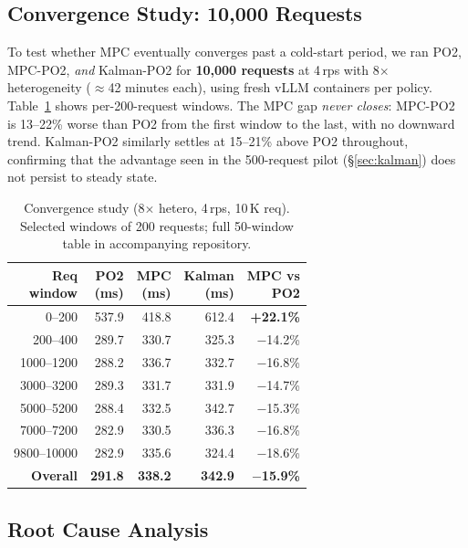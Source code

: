 \documentclass[blind]{gtac}
\begin{document}
\subsection{Convergence Study: 10,000 Requests}

To test whether MPC eventually converges past a cold-start period,
we ran PO2, MPC-PO2, \emph{and} Kalman-PO2 for \textbf{10,000 requests}
at 4\,rps with 8$\times$ heterogeneity ($\approx$42 minutes each),
using fresh vLLM containers per policy.
Table~\ref{tab:conv} shows per-200-request windows.
The MPC gap \emph{never closes}: MPC-PO2 is 13--22\% worse than PO2
from the first window to the last, with no downward trend.
Kalman-PO2 similarly settles at 15--21\% above PO2 throughout,
confirming that the advantage seen in the 500-request pilot
(\S\ref{sec:kalman}) does not persist to steady state.

\begin{table}[h]
\centering
\caption{Convergence study (8$\times$ hetero, 4\,rps, 10\,K req).
  Selected windows of 200 requests; full 50-window table in
  accompanying repository.}
\label{tab:conv}
\small
\begin{tabular}{@{}r r r r r@{}}
\toprule
\thead{Req\\window} & \thead{PO2\\(ms)} & \thead{MPC\\(ms)} & \thead{Kalman\\(ms)} & \thead{MPC vs\\PO2} \\
\midrule
0--200     & 537.9 & 418.8 & 612.4 & \textbf{+22.1\%} \\
200--400   & 289.7 & 330.7 & 325.3 & $-$14.2\% \\
1000--1200 & 288.2 & 336.7 & 332.7 & $-$16.8\% \\
3000--3200 & 289.3 & 331.7 & 331.9 & $-$14.7\% \\
5000--5200 & 288.4 & 332.5 & 342.7 & $-$15.3\% \\
7000--7200 & 282.9 & 330.5 & 336.3 & $-$16.8\% \\
9800--10000& 282.9 & 335.6 & 324.4 & $-$18.6\% \\
\midrule
\textbf{Overall} & \textbf{291.8} & \textbf{338.2} & \textbf{342.9}
  & $-$\textbf{15.9\%} \\
\bottomrule
\end{tabular}
\end{table}

\subsection{Root Cause Analysis}
\end{document}
